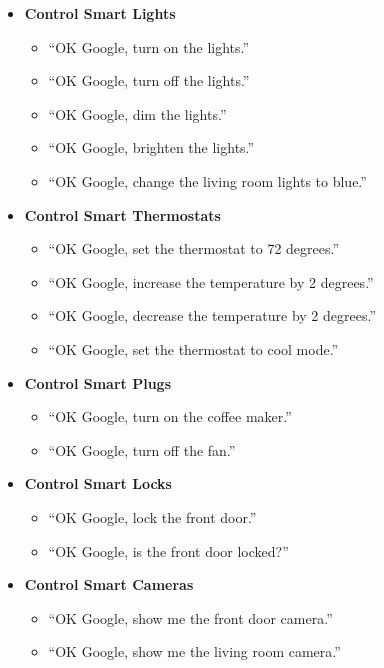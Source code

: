 \documentclass[
  jou,
  floatsintext,
  longtable,
  a4paper,
  nolmodern,
  notxfonts,
  notimes,
  colorlinks=true,linkcolor=blue,citecolor=blue,urlcolor=blue]{apa7}
\providecommand{\tightlist}{%
  \setlength{\itemsep}{0pt}\setlength{\parskip}{0pt}}
\begin{document}
\begin{itemize}
\tightlist
\item
  \textbf{Control Smart Lights}

  \begin{itemize}
  \tightlist
  \item
    ``OK Google, turn on the lights.''
  \item
    ``OK Google, turn off the lights.''
  \item
    ``OK Google, dim the lights.''
  \item
    ``OK Google, brighten the lights.''
  \item
    ``OK Google, change the living room lights to blue.''
  \end{itemize}
\item
  \textbf{Control Smart Thermostats}

  \begin{itemize}
  \tightlist
  \item
    ``OK Google, set the thermostat to 72 degrees.''
  \item
    ``OK Google, increase the temperature by 2 degrees.''
  \item
    ``OK Google, decrease the temperature by 2 degrees.''
  \item
    ``OK Google, set the thermostat to cool mode.''
  \end{itemize}
\item
  \textbf{Control Smart Plugs}

  \begin{itemize}
  \tightlist
  \item
    ``OK Google, turn on the coffee maker.''
  \item
    ``OK Google, turn off the fan.''
  \end{itemize}
\item
  \textbf{Control Smart Locks}

  \begin{itemize}
  \tightlist
  \item
    ``OK Google, lock the front door.''
  \item
    ``OK Google, is the front door locked?''
  \end{itemize}
\item
  \textbf{Control Smart Cameras}

  \begin{itemize}
  \tightlist
  \item
    ``OK Google, show me the front door camera.''
  \item
    ``OK Google, show me the living room camera.''
  \end{itemize}
\end{itemize}
\end{document}
